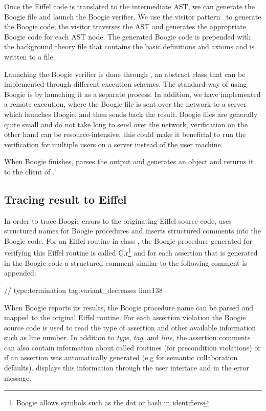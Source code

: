 Once the Eiffel code is translated to the intermediate AST, we can generate the Boogie file and launch the Boogie verifier. We use the visitor pattern~\cite{GAMMA95} to generate the Boogie code; the visitor traverses the AST and generates the appropriate Boogie code for each AST node. The generated Boogie code is prepended with the background theory file that contains the basic definitions and axioms and is written to a file.

Launching the Boogie verifier is done through , an abstract class that can be implemented through different execution schemes. The standard way of using Boogie is by launching it as a separate process. In addition, we have implemented a remote execution, where the Boogie file is sent over the network to a server which launches Boogie, and then sends back the result. Boogie files are generally quite small and do not take long to send over the network, verification on the other hand can be resource-intensive, this could make it beneficial to run the verification for multiple users on a server instead of the user machine.

When Boogie finishes, \AutoProof parses the output and generates an  object and returns it to the client of \AutoProof.


\subsection{Tracing result to Eiffel}

In order to trace Boogie errors to the originating Eiffel source code, \AutoProof uses structured names for Boogie procedures and inserts structured comments into the Boogie code. For an Eiffel routine  in class , the Boogie procedure generated for verifying this Eiffel routine is called \b{C.r}\footnote{Boogie allows symbols such as the dot or hash in identifiers} and for each assertion that is generated in the Boogie code a structured comment similar to the following comment is appended:

\begin{brunning}
 // type:termination tag:variant_decreases line:138
\end{brunning}

When Boogie reports its results, the Boogie procedure name can be parsed and mapped to the original Eiffel routine. For each assertion violation the Boogie source code is used to read the type of assertion and other available information such as line number. In addition to \emph{type}, \emph{tag}, and \emph{line}, the assertion comments can also contain information about called routines (for precondition violations) or if an assertion was automatically generated (e.g for semantic collaboration defaults). \AutoProof displays this information through the user interface and in the error message.

